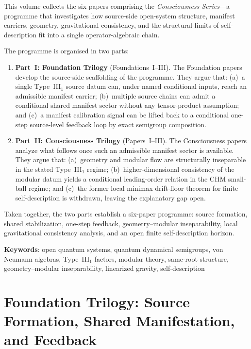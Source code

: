 \documentclass[12pt,a4paper,openany]{book}
\begin{document}
This volume collects the six papers comprising the
\emph{Consciousness Series}---a programme that investigates how
source-side open-system structure, manifest carriers, geometry,
gravitational consistency, and the structural limits of self-description
fit into a single operator-algebraic chain.

The programme is organised in two parts:

\begin{enumerate}
\item \textbf{Part~I: Foundation Trilogy} (Foundations~I--III).
  The Foundation papers develop the source-side scaffolding of the
  programme. They argue that:
  (a)~a single Type~III$_1$ source datum can, under named conditional
  inputs, reach an admissible manifest carrier;
  (b)~multiple source chains can admit a conditional shared manifest
  sector without any tensor-product assumption; and
  (c)~a manifest calibration signal can be lifted back to a conditional
  one-step source-level feedback loop by exact semigroup composition.

\item \textbf{Part~II: Consciousness Trilogy} (Papers~I--III).
  The Consciousness papers analyze what follows once such an admissible
  manifest sector is available. They argue that:
  (a)~geometry and modular flow are structurally inseparable in the
  stated Type~III$_1$ regime;
  (b)~higher-dimensional consistency of the modular datum yields a
  conditional leading-order relation in the CHM small-ball regime; and
  (c)~the former local minimax drift-floor theorem for finite
  self-description is withdrawn, leaving the explanatory gap open.
\end{enumerate}

Taken together, the two parts establish a six-paper programme: source
formation, shared stabilization, one-step feedback, geometry--modular
inseparability, local gravitational consistency analysis, and an open
finite self-description horizon.

\bigskip
\noindent\textbf{Keywords}: open quantum systems, quantum dynamical
semigroups, von Neumann algebras, Type~III$_1$ factors, modular theory,
same-root structure, geometry--modular inseparability, linearized
gravity, self-description

\tableofcontents

\mainmatter

\part{Foundation Trilogy: Source Formation, Shared Manifestation, and Feedback}
\end{document}
